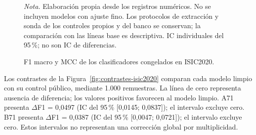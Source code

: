 \begin{figure}[!htbp]
\caption{F1 macro y MCC de los clasificadores congelados en ISIC2020.}
\label{fig:clasificacion-isic2020}
\centering

\par\smallskip
{\singlespacing\fontsize{11}{13}\selectfont\raggedright
\noindent\textit{Nota.} Elaboración propia desde los registros numéricos. No se incluyen modelos con ajuste fino. Los protocolos de extracción y sonda de los controles propios y del banco se conservan; la comparación con las líneas base es descriptiva. IC individuales del 95\,\%; no son IC de diferencias.\par}
\end{figure}
\FloatBarrier
Los contrastes de la Figura~\ref{fig:contrastes-isic2020} comparan cada modelo limpio con su control público, mediante 1.000 remuestras. La línea de cero representa ausencia de diferencia; los valores positivos favorecen al modelo limpio. A71 presenta $\Delta$F1 = 0,0497 (IC del 95\,\% [0,0145; 0,0837]); el intervalo excluye cero. B71 presenta $\Delta$F1 = 0,0387 (IC del 95\,\% [0,0047; 0,0721]); el intervalo excluye cero. Estos intervalos no representan una corrección global por multiplicidad.

